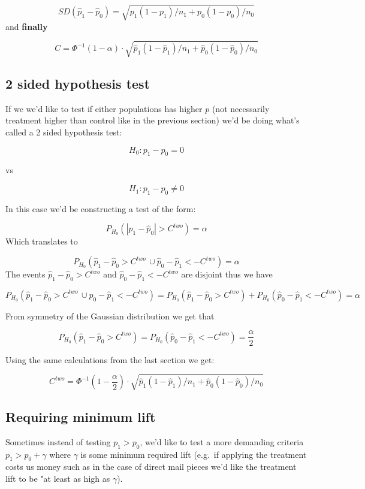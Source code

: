 \documentclass[
]{article}
\begin{document}
\[SD(\hat{p}_1-\hat{p}_0) = \sqrt{p_1(1-p_1)/n_1 + p_0(1-p_0)/n_0}\] and
\textbf{finally}

\[\boxed{C = \Phi^{-1}(1 - \alpha) \cdot \sqrt{\hat{p}_1(1-\hat{p}_1)/n_1 + \hat{p}_0(1-\hat{p}_0)/n_0}}\]

\hypertarget{sided-hypothesis-test}{%
\subsection{2 sided hypothesis test}\label{sided-hypothesis-test}}

If we we'd like to test if either populations has higher \(p\) (not
necessarily treatment higher than control like in the previous section)
we'd be doing what's called a 2 sided hypothesis test:

\[H_0: p_1-p_0 = 0\]

vs

\[H_1: p_1-p_0 \neq 0\]

In this case we'd be constructing a test of the form:

\[P_{H_0}(|\hat{p}_1-\hat{p}_0|>C^{two})=\alpha\] Which translates to

\[P_{H_0}(\hat{p}_1-\hat{p}_0>C^{two} \, \cup \hat{p}_0 - \hat{p}_1 < -C^{two})=\alpha\]
The events \(\hat{p}_1-\hat{p}_0>C^{two}\) and
\(\hat{p}_0 - \hat{p}_1 < -C^{two}\) are disjoint thus we have

\[P_{H_0}(\hat{p}_1-\hat{p}_0>C^{two} \, \cup \hat{p}_0 - \hat{p}_1 < -C^{two}) = P_{H_0}(\hat{p}_1-\hat{p}_0>C^{two}) + P_{H_0}(\hat{p}_0 - \hat{p}_1 < -C^{two}) =\alpha\]

From symmetry of the Gaussian distribution we get that

\[P_{H_0}(\hat{p}_1-\hat{p}_0>C^{two}) = P_{H_0}(\hat{p}_0 - \hat{p}_1 < -C^{two}) = \frac{\alpha}{2}\]

Using the same calculations from the last section we get:

\[\boxed{C^{two} = \Phi^{-1}\left(1 - \frac{\alpha}{2}\right) \cdot \sqrt{\hat{p}_1(1-\hat{p}_1)/n_1 + \hat{p}_0(1-\hat{p}_0)/n_0}}\]

\hypertarget{requiring-minimum-lift}{%
\subsection{Requiring minimum lift}\label{requiring-minimum-lift}}

Sometimes instead of testing \(p_1 > p_0\), we'd like to test a more
demanding criteria \(p_1 > p_0 + \gamma\) where \(\gamma\) is some
minimum required lift (e.g.~if applying the treatment costs us money
such as in the case of direct mail pieces we'd like the treatment lift
to be "at least as high as \(\gamma\)).
\end{document}
